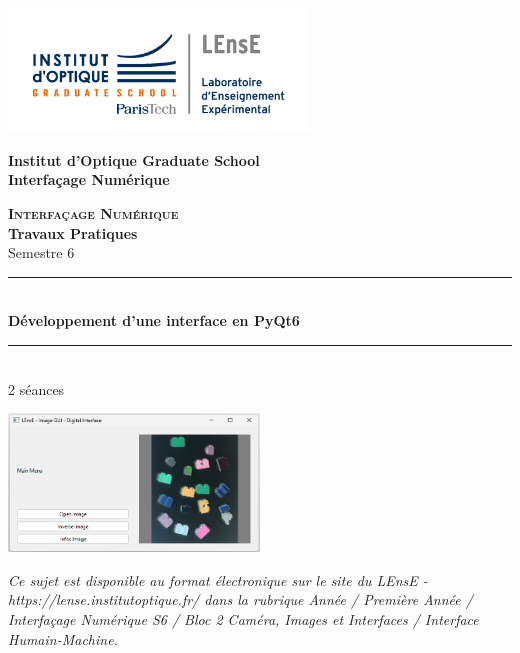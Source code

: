 \documentclass[a4paper,11pt,titlepage]{article} %
\begin{document}
\begin{titlepage}

\begin{center}
	\begin{minipage}{2.5cm}
	\begin{center}
		\includegraphics[width=8cm]{images/Logo-LEnsE.png}
	\end{center}
\end{minipage}\hfill
\begin{minipage}{10cm}
	\begin{center}
	\textbf{Institut d'Optique Graduate School }\\[0.1cm]
    \textbf{Interfaçage Numérique}


	\end{center}
\end{minipage}\hfill


\vspace{4cm}


{\huge \bfseries \textsc{Interfaçage Numérique}} \\[0.5cm]
{\large \bfseries Travaux Pratiques} \\[0.2cm]
Semestre 6

\vspace{2cm}
\rule{\linewidth}{0.3mm} \\[0.4cm]
{ \huge \bfseries\color{violet_iogs} Développement d'une interface en PyQt6 \\[0.4cm] }
\rule{\linewidth}{0.3mm} \\[1cm]

2 séances

\bigskip

\begin{center}
	\includegraphics[width=0.5\textwidth]{images/image_gui.png}
\end{center}

\vfill

\textit{Ce sujet est disponible au format électronique sur le site du LEnsE - https://lense.institutoptique.fr/ dans la rubrique Année / Première Année / Interfaçage Numérique S6 / Bloc 2 Caméra, Images et Interfaces / Interface Humain-Machine.}


\end{center}
\end{titlepage}
\end{document}
